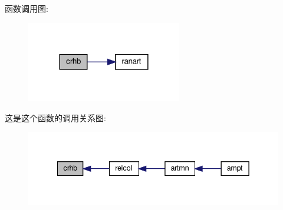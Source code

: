 函数调用图\+:
\nopagebreak
\begin{figure}[H]
\begin{center}
\leavevmode
\includegraphics[width=192pt]{crhb_8f90_a4037a3f20db2ec862ab7310e76c4413e_cgraph}
\end{center}
\end{figure}
这是这个函数的调用关系图\+:
\nopagebreak
\begin{figure}[H]
\begin{center}
\leavevmode
\includegraphics[width=342pt]{crhb_8f90_a4037a3f20db2ec862ab7310e76c4413e_icgraph}
\end{center}
\end{figure}
